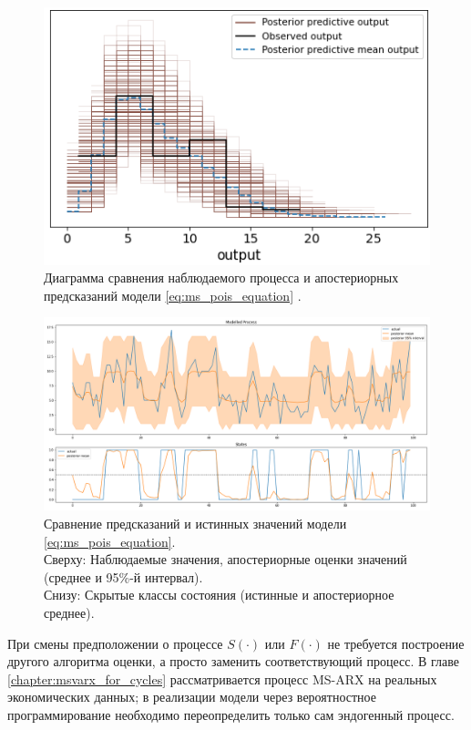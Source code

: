 \documentclass[a4paper,14pt]{extreport}
\begin{document}
\begin{figure}[H]
	\includegraphics[width=\linewidth]{img/gen/pp_ms_pois_ppc.png}
	\caption{
		Диаграмма сравнения наблюдаемого процесса и апостериорных предсказаний модели \eqref{eq:ms_pois_equation}
		.
	}
	\label{fig:pp_ms_pois_ppc}
\end{figure}

\begin{figure}[H]
	\includegraphics[width=\linewidth]{img/gen/pp_ms_pois_fit.png}
	\caption{Сравнение предсказаний и истинных значений модели \eqref{eq:ms_pois_equation}. \\
		Сверху: Наблюдаемые значения, апостериорные оценки значений (среднее и 95\%-й интервал). \\
		Снизу: Скрытые классы состояния (истинные и апостериорное среднее).
	}
	\label{fig:pp_ms_pois_fit}
\end{figure}

При смены предположении о процессе $S(\cdot)$ или $F(\cdot)$ не требуется построение другого алгоритма оценки, а просто заменить соответствующий процесс. В главе \ref{chapter:msvarx_for_cycles} рассматривается процесс MS-ARX на реальных экономических данных; в реализации модели через вероятностное программирование необходимо переопределить только сам эндогенный процесс.
\end{document}
